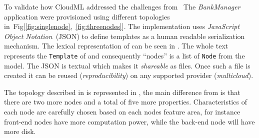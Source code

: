 



To validate how CloudML addressed the challenges from~
The \emph{BankManager} application were provisioned using different topologies in~Fig[\ref{fig:singlenode},~\ref{fig:threenodes}].
The implementation uses \emph{JavaScript Object Notation}~(JSON) to define templates
as a human readable serialization mechanism.
The lexical representation of  can be seen in . 
The whole text represents the \texttt{Template} of  and consequently 
``nodes'' is a list of \texttt{Node} from the model.
The JSON is textual which makes it \emph{shareable} as files.
Once such a file is created it can be reused (\emph{reproducibility}) 
on any supported provider (\emph{multicloud}).


The topology described in  is represented in ,
the main difference from  is that there are two more nodes and a total of 
five more properties.
Characteristics of each node are carefully chosen based on each nodes feature area, for instance 
front-end nodes have more computation power, while the back-end node will have more disk.

